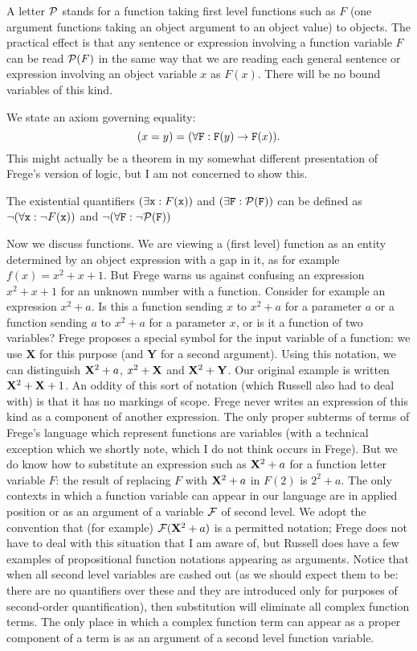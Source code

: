 \documentclass[12pt]{article}
\begin{document}
A letter ${\cal P}$ stands for a function taking first level functions such as $F$ (one argument functions taking an object argument to an object value) to objects.  The practical effect is that any sentence or expression involving  a function variable $F$ can be read ${\cal P}(F)$ in the same way that we are reading each general sentence or expression involving an object variable $x$ as $F(x)$.  There will be no bound variables of this kind.

We state an axiom governing equality: $$(x=y) = (\forall {\tt F}:{\tt F}(y) \rightarrow {\tt F}(x)).$$  This might actually be a theorem in my somewhat different presentation of Frege's version of logic, but I am not concerned to show this.

The existential quantifiers $(\exists {\tt x}:F({\tt x}))$ and $(\exists{\tt  F}:{\cal P}({\tt F}))$ can be defined as $\neg (\forall  {\tt x}:\neg F({\tt x}))$ and $\neg (\forall{\tt  F}:\neg {\cal P}({\tt F}))$ 

Now we discuss functions.  We are viewing a (first level) function as an entity determined by an object expression with a gap in it, as for example $f(x)=x^2+x+1$.  But Frege warns us against confusing an expression $x^2+x+1$ for an unknown number with a function.  Consider for example an expression $x^2+a$.  Is this a function sending $x$ to $x^2+a$ for a parameter
$a$ or a function sending $a$ to $x^2+a$ for a parameter $x$, or is it a function of two variables?  Frege proposes a special symbol for the input variable of a function:  we use
{\bf X} for this purpose (and {\bf Y} for a second argument).  Using this notation, we can distinguish ${\bf X}^2 + a$, $x^2 + {\bf X}$ and ${\bf X}^2+{\bf Y}$.  Our original example is written ${\bf X}^2 + {\bf X}+1$.  An oddity of this sort of notation (which Russell also had to deal with) is that it has no markings of scope.  Frege never writes an expression of this kind as a component of another expression.  The only
proper subterms of terms of Frege's language which represent functions are variables (with a technical exception which we shortly note, which I do not think occurs in Frege).  But we do know how to substitute an expression such as ${\bf X}^2+a$ for a function letter variable $F$:  the result of replacing $F$ with ${\bf X}^2+a$ in $F(2)$ is $2^2+a$.  The only contexts in which a function variable can appear in our language are in applied position or as
an argument of a variable ${\cal F}$ of second level.  We adopt the convention that (for example) ${\cal F}({\bf X}^2 + a)$ is a permitted notation;  Frege does not have to deal with this situation that
I am aware of, but Russell does have a few examples of propositional function notations appearing as arguments.  Notice that when all second level variables are cashed out
(as we should expect them to be:  there are no quantifiers over these and they are introduced only for purposes of second-order quantification), then substitution will eliminate all complex function terms.  The only place in which a complex function term can appear as a proper component of a term is as an argument of a second level function variable.
\end{document}
